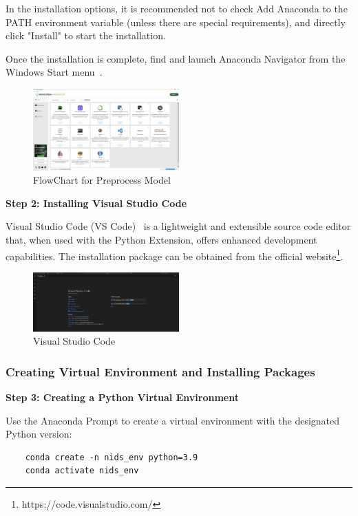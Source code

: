\begin{ZhChapter}
    In the installation options, it is recommended not to check Add Anaconda to the PATH environment variable (unless there are special requirements), and directly click "Install" to start the installation.

    Once the installation is complete, find and launch Anaconda Navigator from the Windows Start menu~\label{fig: AnacondaMenu}.
\begin{figure}[htbp]
    \centering
    \includegraphics[width = 0.5\textwidth]{image/AnacondaMenu.jpg}
    \caption{FlowChart for Preprocess Model}
    \label{fig: AnacondaMenu}
\end{figure}




    \textbf{Step 2: Installing Visual Studio Code}  

    Visual Studio Code (VS Code)~\label{fig: VS} is a lightweight and extensible source code editor that, when used with the Python Extension, offers enhanced development capabilities. The installation package can be obtained from the official website\footnote{https://code.visualstudio.com/}.

\begin{figure}[htbp]
    \centering
    \includegraphics[width = 0.5\textwidth]{image/VS.jpg}
    \caption{Visual Studio Code}
    \label{fig: VS}
\end{figure}

    \subsubsection{Creating Virtual Environment and Installing Packages}

    \textbf{Step 3: Creating a Python Virtual Environment}  

    Use the Anaconda Prompt to create a virtual environment with the designated Python version:
    \begin{verbatim}
    conda create -n nids_env python=3.9
    conda activate nids_env
    \end{verbatim}


\end{ZhChapter}
